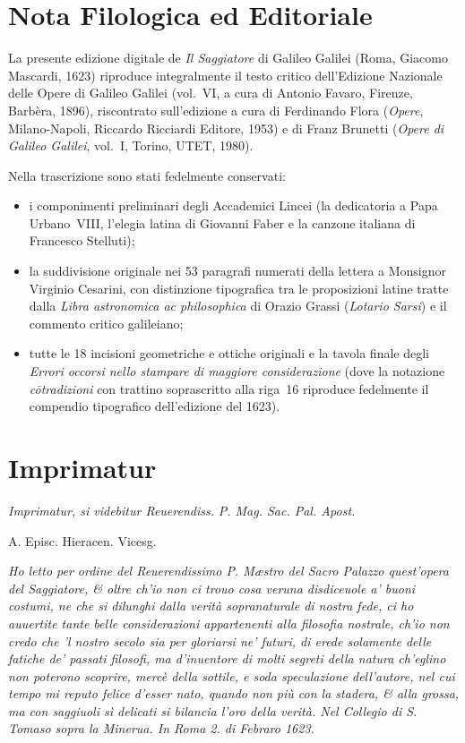 \documentclass[11pt,twoside,openany]{book}
\begin{document}
\chapter*{Nota Filologica ed Editoriale}
{\small
La presente edizione digitale de \textit{Il Saggiatore} di Galileo Galilei (Roma, Giacomo Mascardi, 1623) riproduce integralmente il testo critico dell'Edizione Nazionale delle Opere di Galileo Galilei (vol.~VI, a cura di Antonio Favaro, Firenze, Barbèra, 1896), riscontrato sull'edizione a cura di Ferdinando Flora (\textit{Opere}, Milano-Napoli, Riccardo Ricciardi Editore, 1953) e di Franz Brunetti (\textit{Opere di Galileo Galilei}, vol.~I, Torino, UTET, 1980).

Nella trascrizione sono stati fedelmente conservati:
\begin{itemize}
\item i componimenti preliminari degli Accademici Lincei (la dedicatoria a Papa Urbano~VIII, l'elegia latina di Giovanni Faber e la canzone italiana di Francesco Stelluti);
\item la suddivisione originale nei 53 paragrafi numerati della lettera a Monsignor Virginio Cesarini, con distinzione tipografica tra le proposizioni latine tratte dalla \textit{Libra astronomica ac philosophica} di Orazio Grassi (\textit{Lotario Sarsi}) e il commento critico galileiano;
\item tutte le 18 incisioni geometriche e ottiche originali e la tavola finale degli \textit{Errori occorsi nello stampare di maggiore considerazione} (dove la notazione \textit{c\={o}tradizioni} con trattino soprascritto alla riga~16 riproduce fedelmente il compendio tipografico dell'edizione del 1623).
\end{itemize}
}

\tableofcontents

\chapter*{Imprimatur}

\textit{Imprimatur, si videbitur Reuerendiss. }\textit{P. Mag. Sac. Pal. Apost.}


A. Episc. Hieracen. Vicesg.


\textit{Ho letto per ordine del Reuerendissimo P. Mæstro del Sacro Palazzo quest'opera del Saggiatore, \& oltre ch'io non ci trouo cosa veruna disdiceuole a' buoni costumi, ne che si dilunghi dalla verità sopranaturale di nostra fede, ci ho auuertite tante belle considerazioni appartenenti alla filosofia nostrale, ch'io non credo che 'l nostro secolo sia per gloriarsi ne' futuri, di erede solamente delle fatiche de' passati filosofi, ma d'inuentore di molti segreti della natura ch'eglino non poterono scoprire, mercè della sottile, e soda speculazione dell'autore, nel cui tempo mi reputo felice d'esser nato, quando non più con la stadera, \& alla grossa, ma con saggiuoli sì delicati si bilancia l'oro della verità. Nel Collegio di S. Tomaso sopra la Minerua. In Roma 2. di Febraro 1623.}
\end{document}
